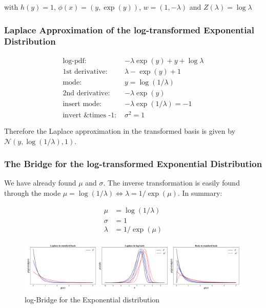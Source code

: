 with $h(y) =1$, $\phi(x) = (y, \exp(y))$, $w = (1, -\lambda)$ and $Z(\lambda)=\log\lambda$

\subsubsection{Laplace Approximation of the log-transformed Exponential Distribution}

\begin{align*}
\text{log-pdf: } & -\lambda \exp(y) + y + \log\lambda \\
\text{1st derivative: }& \lambda -\exp(y) + 1 \\
\text{mode: } & y = \log(1/\lambda) \\
\text{2nd derivative: }& -\lambda\exp(y)\\
\text{insert mode: }& -\lambda\exp(1/\lambda) = -1\\
\text{invert \& times -1: }&\sigma^2 = 1
\end{align*}

Therefore the Laplace approximation in the transformed basis is given by $\mathcal{N}(y, \log(1/\lambda), 1)$. 

\subsubsection{The Bridge for the log-transformed Exponential Distribution}

We have already found $\mu$ and $\sigma$. The inverse transformation is easily found through the mode $\mu = \log(1/\lambda) \Leftrightarrow \lambda = 1/\exp(\mu)$. In summary:

\begin{subequations}
\begin{align}
	\mu &= \log(1/\lambda) \\
	\sigma &= 1 \\
	\lambda &= 1/\exp(\mu)
\end{align}
\end{subequations}

\begin{figure}[!htb]
	\centering
	\includegraphics[width=\textwidth]{figures/exponential_log_bridge.pdf}
	\caption{log-Bridge for the Exponential distribution}
	\label{fig:exponential_log_bridge}
\end{figure}

